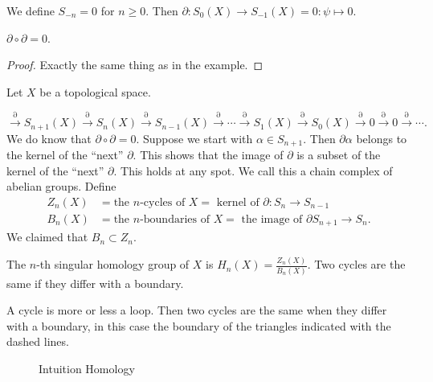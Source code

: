  \begin{remark}
     We define $S_{-n} = 0$ for $n \ge 0$.
     Then $\partial: S_0(X) \to  S_{-1}(X) = 0: \psi \mapsto 0$.
 \end{remark}

 \begin{prop}[1.3]
     $\partial \circ \partial = 0$.
 \end{prop}
 \begin{proof}
     Exactly the same thing as in the example.
 \end{proof}

 Let $X$ be a topological space.

 \[
     \xrightarrow{\partial} S_{n+1}(X)
    \xrightarrow{\partial}  S_{n}(X)
    \xrightarrow{\partial}  S_{n-1}(X)
    \xrightarrow{\partial}  \cdots
    \xrightarrow{\partial}  S_{1}(X)
    \xrightarrow{\partial}  S_{0}(X)
    \xrightarrow{\partial} 0 
    \xrightarrow{\partial} 0 
    \xrightarrow{\partial} \cdots
 .\] 
 We do know that $\partial  \circ \partial = 0$.
 Suppose we start with $\alpha \in S_{n+1}$. Then $\partial \alpha$ belongs to the kernel of the ``next'' $\partial$.
 This shows that  the image of $\partial$ is a subset of the kernel of the ``next''  $\partial$.
 This holds at any spot.
 We call this a chain complex of abelian groups.
 Define
 \begin{align*}
     Z_n(X) &= \text{the $n$-cycles of $X = $ kernel of $\partial: S_n \to  S_{n-1}$}\\
     B_n(X) &=  \text{the $n$-boundaries of $X = $ the image of $\partial S_{n+1} \to  S_n$}
 .\end{align*}
 We claimed that $B_n \subset Z_n$.
 \begin{definition}
     The $n$-th singular homology group of $X$ is  $H_n(X) = \frac{Z_n(X)}{B_n(X)}$.
     Two cycles are the same if they differ with a boundary.
 \end{definition}


A cycle is more or less a loop.  Then two cycles are the same when they differ with a boundary, in this case the boundary of the triangles indicated with the dashed lines.
\begin{figure}[H]
    \centering
    \caption{Intuition Homology}
    \label{fig:intuition-homology}
\end{figure}
